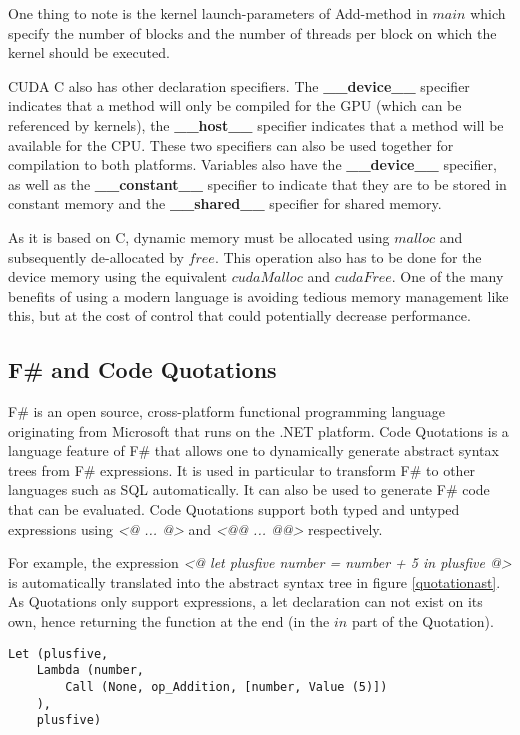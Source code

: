 One thing to note is the kernel launch-parameters of Add-method in $main$ which specify the number of blocks and the number of threads per block on which the kernel should be executed. 

CUDA C also has other declaration specifiers. 
The \textbf{\_\_device\_\_} specifier indicates that a method will only be compiled for the GPU (which can be referenced by kernels), the \textbf{\_\_host\_\_} specifier indicates that a method will be available for the CPU.
These two specifiers can also be used together for compilation to both platforms.
Variables also have the \textbf{\_\_device\_\_} specifier, as well as the \textbf{\_\_constant\_\_} specifier to indicate that they are to be stored in constant memory and the \textbf{\_\_shared\_\_} specifier for shared memory.

As it is based on C, dynamic memory must be allocated using $malloc$ and subsequently de-allocated by $free$.
This operation also has to be done for the device memory using the equivalent $cudaMalloc$ and $cudaFree$.
One of the many benefits of using a modern language is avoiding tedious memory management like this, but at the cost of control that could potentially decrease performance.

\subsection{F\# and Code Quotations}\label{subsec:background:codequotations}
F\#\cite{fsharp} is an open source, cross-platform functional programming language originating from Microsoft that runs on the .NET platform.
Code Quotations is a language feature of F\# that allows one to dynamically generate abstract syntax trees from F\# expressions. 
It is used in particular to transform F\# to other languages such as SQL automatically. 
It can also be used to generate F\# code that can be evaluated. 
Code Quotations support both typed and untyped expressions using \emph{\textless @ ... @\textgreater} and \emph{\textless @@ ... @@\textgreater} respectively. 

For example, the expression \emph{\textless @ let plusfive number = number + 5 in plusfive @\textgreater} is automatically translated into the abstract syntax tree in figure \ref{quotationast}. 
As Quotations only support expressions, a let declaration can not exist on its own, hence returning the function at the end (in the $in$ part of the Quotation).

\begin{lstlisting}[caption=Abstract syntax tree for the example Quotation expression, label=quotationast]
Let (plusfive, 
	Lambda (number, 
		Call (None, op_Addition, [number, Value (5)])
	), 
	plusfive)
\end{lstlisting}

